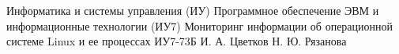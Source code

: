 \makecourseworktitle
{Информатика и системы управления (ИУ)}
{Программное обеспечение ЭВМ и информационные технологии (ИУ7)}
{Мониторинг информации об операционной системе Linux и ее процессах}
{ИУ7-73Б}
{И. А. Цветков}
{Н. Ю. Рязанова}
{}
{}
